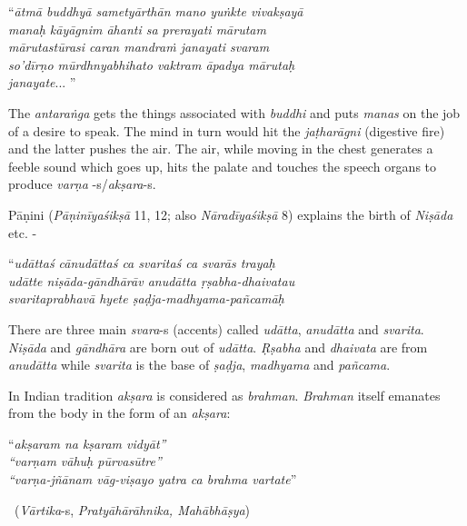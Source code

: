 \begin{longquote}
“\textit{ātmā buddhyā sametyārthān mano yuṅkte vivakṣayā }\\ \textit{manaḥ kāyāgnim āhanti sa prerayati mārutam }\\ \textit{mārutastūrasi caran mandraṁ janayati svaram }\\ \textit{so’dīrṇo mūrdhnyabhihato vaktram āpadya mārutaḥ }\\ \textit{janayate}... ”
\end{longquote}

The \textit{antaraṅga} gets the things associated with \textit{buddhi} and puts \textit{manas} on the job of a desire to speak. The mind in turn would hit the \textit{jaṭharāgni} (digestive fire) and the latter pushes the air. The air, while moving in the chest generates a feeble sound which goes up, hits the palate and touches the speech organs to produce \textit{varṇa} -s/\textit{akṣara}-s.

Pāṇini (\textit{Pāṇinīyaśikṣā} 11, 12; also \textit{Nāradīyaśikṣā} 8) explains the birth of \textit{Niṣāda} etc. -

\begin{longquote}
“\textit{udāttaś cānudāttaś ca svaritaś ca svarās trayaḥ }\\ \textit{udātte niṣāda-gāndhārāv anudātta ṛṣabha-dhaivatau }\\\textit{svaritaprabhavā hyete ṣaḍja-madhyama-pañcamāḥ} 
\end{longquote}

There are three main \textit{svara}-s (accents) called \textit{udātta}, \textit{anudātta} and \textit{svarita}. \textit{Niṣāda} and \textit{gāndhāra} are born out of \textit{udātta}. \textit{Ṛṣabha} and \textit{dhaivata} are from \textit{anudātta} while \textit{svarita} is the base of \textit{ṣaḍja}, \textit{madhyama} and \textit{pañcama}.

In Indian tradition \textit{akṣara} is considered as \textit{brahman}. \textit{Brahman} itself emanates from the body in the form of an \textit{akṣara}:

\newpage

\begin{longquote}
“\textit{akṣaram na kṣaram vidyāt”}\\ \textit{“varṇam vāhuḥ pūrvasūtre”}\\ \textit{“varṇa-jñānam vāg-viṣayo yatra ca brahma vartate}” 

~\hfill (\textit{Vārtika}-s, \textit{Pratyāhārāhnika, Mahābhāṣya})
\end{longquote}

